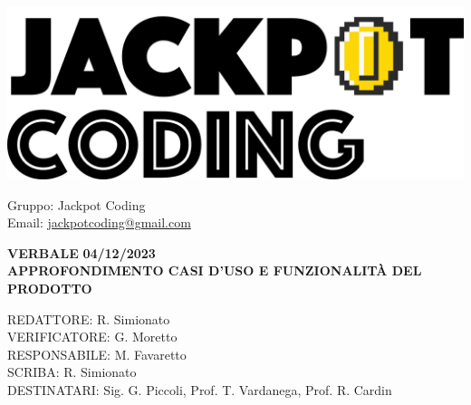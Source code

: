 \documentclass[5pt]{article}
\begin{document}
\begin{minipage}[t]{0.50\textwidth}
    \begin{flushleft}
        \hspace{10pt}
        \includegraphics[scale=0.65]{jackpot-logo.png} 
    \end{flushleft}
\end{minipage}
\hspace{-60pt} %
\begin{flushright}
    \begin{minipage}[t]{0.50\textwidth}
        \begin{flushright}
            Gruppo: {\Large Jackpot Coding}\\
            Email: \href{mailto:jackpotcoding@gmail.com}{jackpotcoding@gmail.com}
        \end{flushright}
    \end{minipage}
\end{flushright}

\vspace{20pt}

\begin{center}
    \textbf{\large VERBALE }
    \textbf{\large 04/12/2023} \\
    \textbf{\LARGE APPROFONDIMENTO CASI D'USO E FUNZIONALITÀ DEL PRODOTTO}
\end{center}

\vspace{13pt}

\begin{flushleft}
    \begin{spacing}{1.5}
        REDATTORE: R. Simionato\\ 
        VERIFICATORE: G. Moretto\\ 
        RESPONSABILE: M. Favaretto\\ 
        \vspace{7pt}
        SCRIBA: R. Simionato\\ 
        \vspace{7pt}
        DESTINATARI: Sig. G. Piccoli, Prof. T. Vardanega, Prof. R. Cardin\\ 
    \end{spacing}
\end{flushleft}
\end{document}
